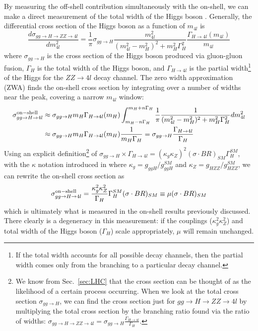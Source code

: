 By measuring the off-shell contribution simultaneously with the on-shell, we can make a direct measurement of the total width of the Higgs boson \cite{}. Generally, the differential cross section of the Higgs boson as a function of $m_{4l}$ is 
\begin{equation}
\frac{d\sigma_{gg\rightarrow H\rightarrow ZZ\rightarrow 4l}}{dm^2_{4l}} = \frac{1}{\pi} \sigma_{gg\rightarrow H} \frac{m_{4l}^2}{(m_{4l}^2-m_{H}^2)^2+m_H^2\Gamma_{H}^2}\frac{\Gamma_{H\rightarrow 4l}(m_{4l})}{m_{4l}}
\label{eqn:DiffCrossSection}
\end{equation}
where $\sigma_{gg\rightarrow H}$ is the cross section of the Higgs boson produced via gluon-gluon fusion, $\Gamma_{H}$ is the total width of the Higgs boson, and $\Gamma_{H\rightarrow 4l}$ is the partial width\footnote{If the total width accounts for all possible decay channels, then the partial width comes only from the branching to a particular decay channel.} of the Higgs for the $ZZ\rightarrow 4l$ decay channel. The zero width approximation (ZWA) finds the on-shell cross section by integrating over a number of widths near the peak, covering a narrow $m_{4l}$ window:
\begin{equation}
\begin{split}
\sigma_{gg\rightarrow H\rightarrow 4l}^{\rm on-shell} &\approx \sigma_{gg\rightarrow H}m_{H}\Gamma_{H\rightarrow 4l}(m_{H})\int_{m_H-n\Gamma_H}^{m_H+n\Gamma_H} \frac{1}{\pi}\frac{1}{(m_{4l}^2-m_{H}^2)^2 + m_H^2\Gamma_H^2}dm_{4l}^2 \\
&\approx \sigma_{gg\rightarrow H}m_{H}\Gamma_{H\rightarrow 4l}(m_{H})\frac{1}{m_H\Gamma_H} = \sigma_{gg\rightarrow H}\frac{\Gamma_{H\rightarrow 4l}}{\Gamma_H}
\end{split}
\end{equation}
Using an explicit definition\footnote{We know from Sec.~\ref{sec:LHC} that the cross section can be thought of as the likelihood of a certain process occurring. When we look at the total cross section $\sigma_{gg\rightarrow H}$, we can find the cross section just for $gg \rightarrow H \rightarrow ZZ \rightarrow 4l$ by multiplying the total cross section by the branching ratio found via the ratio of widths: $\sigma_{gg\rightarrow H \rightarrow ZZ \rightarrow 4l} = \sigma_{gg\rightarrow H} \frac{\Gamma_{H \rightarrow 4l}}{\Gamma_{H}}$.} of $\sigma_{gg\rightarrow H}\times\Gamma_{H\rightarrow 4l} = \left(\kappa_g\kappa_Z\right)^2(\sigma\cdot BR)_{SM}\Gamma_{H}^{SM}$, with the $\kappa$ notation introduced in \cite{} where $\kappa_g = g_{ggH}/g_{ggH}^{SM}$ and $\kappa_Z = g_{HZZ}/g_{HZZ}^{SM}$, we can rewrite the on-shell cross section as
\begin{equation}
\sigma_{gg\rightarrow H\rightarrow 4l}^{\rm on-shell} = \frac{\kappa_g^2\kappa_Z^2}{\Gamma_{H}}\Gamma_{H}^{SM}(\sigma\cdot BR)_{SM} \equiv \mu(\sigma\cdot BR)_{SM} 
\label{eqn:DiffCrossSection_OnShell}
\end{equation}
which is ultimately what is measured in the on-shell results previously discussed. There clearly is a degeneracy in this measurement: if the couplings ($\kappa_g^2\kappa_Z^2$) and total width of the Higgs boson ($\Gamma_H$) scale appropriately, $\mu$ will remain unchanged.

